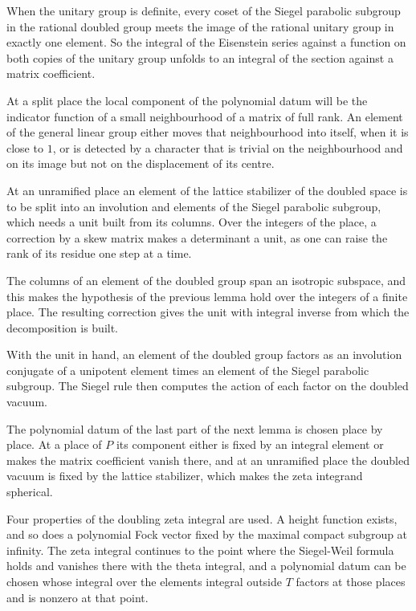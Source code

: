 When the unitary group is definite, every coset of the Siegel parabolic subgroup
in the rational doubled group meets the image of the rational unitary group in
exactly one element. So the integral of the Eisenstein series against a function
on both copies of the unitary group unfolds to an integral of the section
against a matrix coefficient.

At a split place the local component of the polynomial datum will be the
indicator function of a small neighbourhood of a matrix of full rank. An
element of the general linear group either moves that neighbourhood into
itself, when it is close to $1$, or is detected by a character that is trivial
on the neighbourhood and on its image but not on the displacement of its
centre.

At an unramified place an element of the lattice stabilizer of the doubled
space is to be split into an involution and elements of the Siegel parabolic
subgroup, which needs a unit built from its columns. Over the integers of the
place, a correction by a skew matrix makes a determinant a unit, as one can
raise the rank of its residue one step at a time.

The columns of an element of the doubled group span an isotropic subspace, and
this makes the hypothesis of the previous lemma hold over the integers of a
finite place. The resulting correction gives the unit with integral inverse
from which the decomposition is built.

With the unit in hand, an element of the doubled group factors as an involution
conjugate of a unipotent element times an element of the Siegel parabolic
subgroup. The Siegel rule then computes the action of each factor on the
doubled vacuum.

The polynomial datum of the last part of the next lemma is chosen place by
place. At a place of $P$ its component either is fixed by an integral element
or makes the matrix coefficient vanish there, and at an unramified place the
doubled vacuum is fixed by the lattice stabilizer, which makes the zeta
integrand spherical.

Four properties of the doubling zeta integral are used. A height function
exists, and so does a polynomial Fock vector fixed by the maximal compact
subgroup at infinity. The zeta integral continues to the point where the
Siegel-Weil formula holds and vanishes there with the theta integral, and a
polynomial datum can be chosen whose integral over the elements integral
outside $T$ factors at those places and is nonzero at that point.

